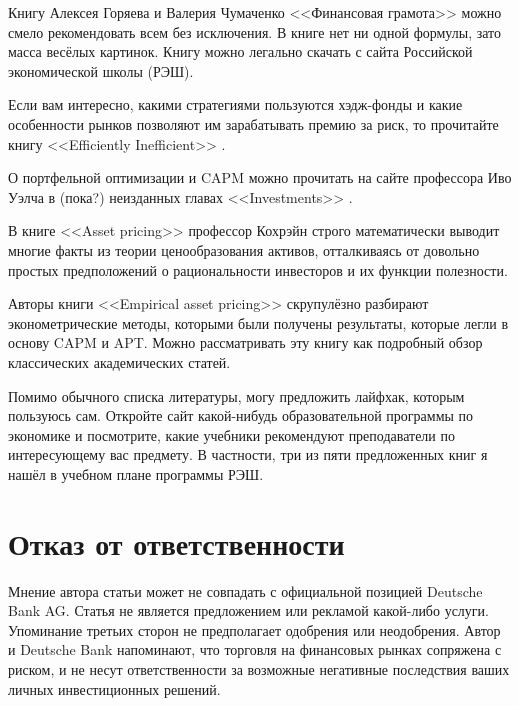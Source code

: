 Книгу Алексея Горяева и Валерия Чумаченко <<Финансовая грамота>> \cite{goryaev2009} можно смело рекомендовать всем без исключения. В книге нет ни одной формулы, зато масса весёлых картинок. Книгу можно легально скачать с сайта Российской экономической школы (РЭШ).

Если вам интересно, какими стратегиями пользуются хэдж-фонды и какие особенности рынков позволяют им зарабатывать премию за риск, то прочитайте книгу <<Efficiently Inefficient>> \cite{pedersen2015efficiently}.

О портфельной оптимизации и CAPM можно прочитать на сайте профессора Иво Уэлча в (пока?) неизданных главах <<Investments>> \cite{welch}.

В книге <<Asset pricing>> \cite{cochrane2005asset} профессор Кохрэйн строго математически выводит многие факты из теории ценообразования активов, отталкиваясь от довольно простых предположений о рациональности инвесторов и их функции полезности.

Авторы книги <<Empirical asset pricing>> \cite{bali2016empirical} скрупулёзно разбирают эконометрические методы, которыми были получены результаты, которые легли в основу CAPM и APT. Можно рассматривать эту книгу как подробный обзор классических академических статей.

Помимо обычного списка литературы, могу предложить лайфхак, которым пользуюсь сам. Откройте сайт какой-нибудь образовательной программы по экономике и посмотрите, какие учебники рекомендуют преподаватели по интересующему вас предмету. В частности, три из пяти предложенных книг я нашёл в учебном плане программы  РЭШ.

\section*{Отказ от ответственности}

Мнение автора статьи может не совпадать с официальной позицией Deutsche Bank AG.
Статья не является предложением или рекламой какой-либо услуги. Упоминание
третьих сторон не предполагает одобрения или неодобрения. Автор и Deutsche Bank
напоминают, что торговля на финансовых рынках сопряжена с риском, и не несут
ответственности за возможные негативные последствия ваших личных инвестиционных
решений.

\en{
\printbibliography[title = \ru{Список литературы}]
}
\printendnotes

